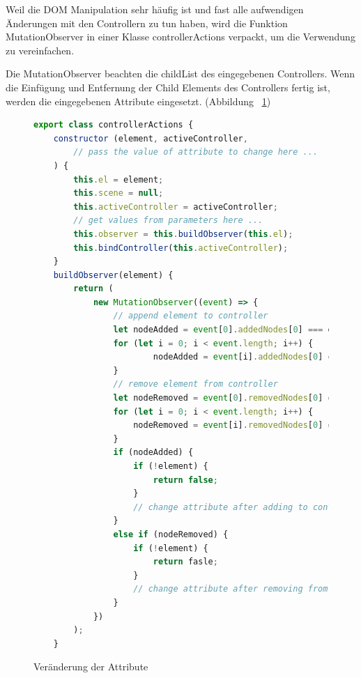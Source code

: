   Weil die DOM Manipulation sehr häufig ist und fast alle aufwendigen Änderungen mit den Controllern zu tun haben, wird die Funktion {\selectfont MutationObserver} in einer Klasse {\selectfont controllerActions} verpackt, um die Verwendung zu vereinfachen.
  
  Die {\selectfont MutationObserver} beachten die {\selectfont childList} des eingegebenen Controllers. Wenn die Einfügung und Entfernung der Child Elements des Controllers fertig ist, werden die eingegebenen Attribute eingesetzt. (Abbildung ~\ref{fig:controllerAction})
  
\begin{figure}[ht]
\vspace*{1em}
\centering
\caption[Veränderung der Attribute]{Veränderung der Attribute}
\begin{lstlisting}[language=JavaScript, style=htmlcssjs]
export class controllerActions {
    constructor (element, activeController, 
        // pass the value of attribute to change here ...
    ) {
        this.el = element;
        this.scene = null;
        this.activeController = activeController;
        // get values from parameters here ...
        this.observer = this.buildObserver(this.el);
        this.bindController(this.activeController);
    }
    buildObserver(element) {
        return (
            new MutationObserver((event) => {
                // append element to controller
                let nodeAdded = event[0].addedNodes[0] === element;
                for (let i = 0; i < event.length; i++) {
                        nodeAdded = event[i].addedNodes[0] === element;
                }
                // remove element from controller
                let nodeRemoved = event[0].removedNodes[0] === element;
                for (let i = 0; i < event.length; i++) {
                    nodeRemoved = event[i].removedNodes[0] === element;
                }
                if (nodeAdded) {
                    if (!element) {
                        return false;
                    }
                    // change attribute after adding to controller here ...
                }
                else if (nodeRemoved) {
                    if (!element) {
                        return fasle;
                    }
                    // change attribute after removing from controller here ...
                }
            })
        );
    }
\end{lstlisting}
\label{fig:controllerAction} 
\end{figure}
  
